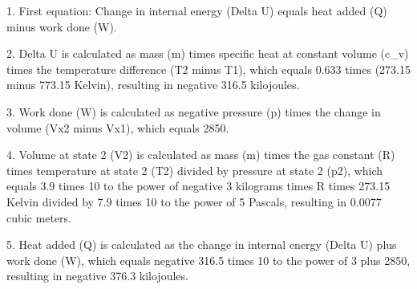1. First equation: Change in internal energy (Delta U) equals heat added (Q) minus work done (W).

2. Delta U is calculated as mass (m) times specific heat at constant volume (c_v) times the temperature difference (T2 minus T1), which equals 0.633 times (273.15 minus 773.15 Kelvin), resulting in negative 316.5 kilojoules.

3. Work done (W) is calculated as negative pressure (p) times the change in volume (Vx2 minus Vx1), which equals 2850.

4. Volume at state 2 (V2) is calculated as mass (m) times the gas constant (R) times temperature at state 2 (T2) divided by pressure at state 2 (p2), which equals 3.9 times 10 to the power of negative 3 kilograms times R times 273.15 Kelvin divided by 7.9 times 10 to the power of 5 Pascals, resulting in 0.0077 cubic meters.

5. Heat added (Q) is calculated as the change in internal energy (Delta U) plus work done (W), which equals negative 316.5 times 10 to the power of 3 plus 2850, resulting in negative 376.3 kilojoules.